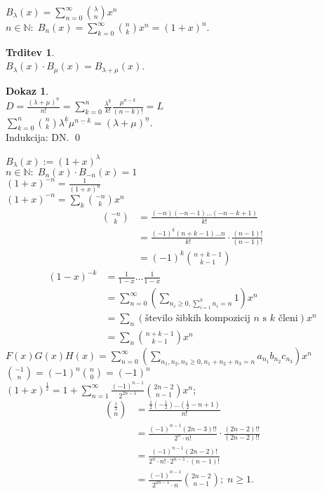 \documentclass[a4paper, 12pt]{book}
\theoremstyle{definition}
\newtheorem{claim}[counter]{Trditev}
\newtheorem{pro}[counter]{Dokaz}
\theoremstyle{remark}
\newcommand{\N}{\mathbb{N}}
\begin{document}
$B_{\lambda}(x) = \sum_{n=0}^{\infty} \binom{\lambda}{n} x^n$ \\
$n \in \N: \; B_n(x) = \sum_{k=0}^{\infty} \binom{n}{k} x^n = (1+x)^n$.
\begin{claim} \text{} \\
  $B_{\lambda}(x) \cdot B_{\mu}(x) = B_{\lambda + \mu}(x)$.
\end{claim}
\begin{pro} \text{} \\
  $D = \frac{(\lambda + \mu)^{\underline{n}}}{n!} =
    \sum_{k=0}^{n}\frac{\lambda^{\underline{k}}}{k!} \frac{\mu^{\underline{n-k}}}{(n-k)!} = L$ \\
  $\sum_{k=0}^{n} \binom{n}{k} \lambda^{\underline{k}} \mu^{\underline{n-k}} = (\lambda + \mu)^{\underline{n}}$. \\
  Indukcija: DN.
  \qed
\end{pro}
$B_{\lambda}(x) := (1+x)^{\lambda}$ \\
$n \in \N: \; B_n(x) \cdot B_{-n}(x) = 1$ \\
$(1+x)^{-n} = \frac{1}{(1+x)^n}$ \\
$(1+x)^{-n} = \sum_k \binom{-n}{k} x^n$ \\
\begin{align*}
  \binom{-n}{k} &= \frac{(-n) (-n-1) \dots (-n-k+1)}{k!} \\
  &= \frac{(-1)^k (n+k-1) \dots n}{k!} \cdot \frac{(n-1)!}{(n-1)!} \\
  &= (-1)^k \binom{n+k-1}{k-1}
\end{align*}
\begin{align*}
  (1-x)^{-k} &= \frac{1}{1-x} \dots \frac{1}{1-x} \\
  &= \sum_{n=0}^{\infty} \left(\sum_{n_i \geq 0, \sum_{i=1}^k n_i = n} 1 \right) x^n \\
  &= \sum_n (\text{število šibkih kompozicij } n \text{ s } k \text{ členi}) x^n \\
  &= \sum_n \binom{n+k-1}{k-1} x^n
\end{align*}
$F(x) G(x) H(x) = \sum_{n=0}^{\infty} \left(\sum_{n_1, n_2, n_3 \geq 0, n_1 + n_2 + n_3 = n} a_{n_1} b_{n_2} c_{n_3}\right) x^n$ \\
$\binom{-1}{n} = (-1)^n \binom{n}{0} = (-1)^n$ \\
$(1+x)^{\frac{1}{2}} = 1 + \sum_{n=1}^{\infty} \frac{(-1)^{n-1}}{2^{2n-1}} \binom{2n-2}{n-1} x^n$; \\
\begin{align*}
  \binom{\frac{1}{2}}{n} &= \frac{\frac{1}{2} \left(-\frac{1}{2}\right) \dots \left(\frac{1}{2}-n+1\right)}{n!} \\
  &= \frac{(-1)^{n-1} (2n-3)!!}{2^n \cdot n!} \cdot \frac{(2n-2)!!}{(2n-2)!!} \\
  &= \frac{(-1)^{n-1} (2n-2)!}{2^n \cdot n! \cdot 2^{n-1} \cdot (n-1)!} \\
  &= \frac{(-1)^{n-1}}{2^{2n-1} \cdot n} \binom{2n-2}{n-1}; \; n \geq 1.
\end{align*}
\end{document}
